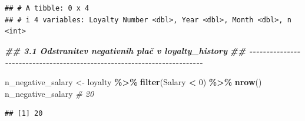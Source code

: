 \documentclass[
]{article}
\newenvironment{Shaded}{\begin{snugshade}}{\end{snugshade}}
\newcommand{\CommentTok}[1]{\textcolor[rgb]{0.56,0.35,0.01}{\textit{#1}}}
\newcommand{\DecValTok}[1]{\textcolor[rgb]{0.00,0.00,0.81}{#1}}
\newcommand{\DocumentationTok}[1]{\textcolor[rgb]{0.56,0.35,0.01}{\textbf{\textit{#1}}}}
\newcommand{\FunctionTok}[1]{\textcolor[rgb]{0.13,0.29,0.53}{\textbf{#1}}}
\newcommand{\NormalTok}[1]{#1}
\newcommand{\OtherTok}[1]{\textcolor[rgb]{0.56,0.35,0.01}{#1}}
\newcommand{\SpecialCharTok}[1]{\textcolor[rgb]{0.81,0.36,0.00}{\textbf{#1}}}
\begin{document}
\begin{verbatim}
## # A tibble: 0 x 4
## # i 4 variables: Loyalty Number <dbl>, Year <dbl>, Month <dbl>, n <int>
\end{verbatim}

\begin{Shaded}
\begin{Highlighting}[]
\DocumentationTok{\#\# 3.1 Odstranitev negativnih plač v loyalty\_history}
\DocumentationTok{\#\# {-}{-}{-}{-}{-}{-}{-}{-}{-}{-}{-}{-}{-}{-}{-}{-}{-}{-}{-}{-}{-}{-}{-}{-}{-}{-}{-}{-}{-}{-}{-}{-}{-}{-}{-}{-}{-}{-}{-}{-}{-}{-}{-}{-}{-}{-}{-}{-}{-}{-}{-}{-}{-}{-}{-}{-}{-}{-}{-}{-}{-}{-}{-}{-}{-}{-}{-}{-}{-}{-}{-}{-}{-}}

\NormalTok{n\_negative\_salary }\OtherTok{\textless{}{-}}\NormalTok{ loyalty }\SpecialCharTok{\%\textgreater{}\%} \FunctionTok{filter}\NormalTok{(Salary }\SpecialCharTok{\textless{}} \DecValTok{0}\NormalTok{) }\SpecialCharTok{\%\textgreater{}\%} \FunctionTok{nrow}\NormalTok{()}
\NormalTok{n\_negative\_salary   }\CommentTok{\# 20}
\end{Highlighting}
\end{Shaded}

\begin{verbatim}
## [1] 20
\end{verbatim}
\end{document}
